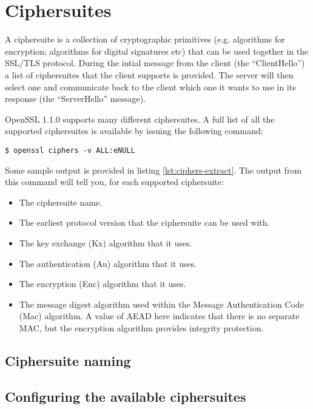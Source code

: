 \chapter{Ciphersuites}

A ciphersuite is a collection of cryptographic primitives (e.g. algorithms for 
encryption; algorithms for digital signatures etc) that can be used
together in the SSL/TLS protocol. During the intial message from the client 
(the ``ClientHello'') a list of ciphersuites that the client supports is 
provided. The server will then select one and communicate back to the client 
which one it wants to use in its response (the ``ServerHello'' message).

OpenSSL 1.1.0 supports many different ciphersuites. A full list of all the
supported ciphersuites is available by issuing the following command:

\begin{verbatim}
$ openssl ciphers -v ALL:eNULL
\end{verbatim}

Some sample output is provided in listing \ref{lst:ciphers-extract}. The output 
from this command will tell you, for each supported ciphersuite:

\begin{itemize}
\item The ciphersuite name.
\item The earliest protocol version that the ciphersuite can be used with.
\item The key exchange (Kx) algorithm that it uses.
\item The authentication (Au) algorithm that it uses.
\item The encryption (Enc) algorithm that it uses.
\item The message digest algorithm used within the Message Authentication Code 
(Mac) algorithm. A value of AEAD here indicates that there is no separate MAC, 
but the encryption algorithm provides integrity protection.
\end{itemize}

\section{Ciphersuite naming}


\section{Configuring the available ciphersuites}

